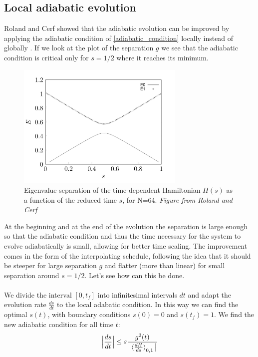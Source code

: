     \subsection{Local adiabatic evolution}\label{subsec:local adiabatic}
    Roland and Cerf showed that the adiabatic evolution can be improved by applying the adiabatic condition of \cref{adiabatic_condition} locally instead of globally \cite{Roland2002}. If we look at the plot of the separation $g$ we see that the adiabatic condition is critical only for $s=1/2$ where it reaches its minimum.
    \begin{figure}[h]
      \centering
      \includegraphics[width=80mm]{figures/chapter1/separation}
      \caption[Eigenvalue separation of the time-dependent Hamiltonian $H(s)$ as a function of the reduced time $s$, for N=64]{Eigenvalue separation of the time-dependent Hamiltonian $H(s)$ as a function of the reduced time $s$, for N=64. \textit{Figure from Roland and Cerf} \cite{Roland2002}}
      \label{separation_figure}
    \end{figure}
    At the beginning and at the end of the evolution the separation is large enough so that the adiabatic condition and thus the time necessary for the system to evolve adiabatically is small, allowing for better time scaling. The improvement comes in the form of the interpolating schedule, following the idea that it should be steeper for large separation $g$ and flatter (more than linear) for small separation around $s=1/2$. Let's see how can this be done. \\ \\
    We divide the interval $[0,t_f]$ into infinitesimal intervals $dt$ and adapt the evolution rate $\frac{ds}{dt}$ to the local adabatic condition. In this way we can find the optimal $s(t)$, with boundary conditions $s(0)=0$ and $s(t_f)=1$. We find the new adiabatic condition for all time $t$:
    \begin{equation}
      \Big|\frac{ds}{dt}\Big|\leq\varepsilon\frac{g^2(t)}{\big|\braket{\frac{dH}{ds}}_{0,1}\big|}
    \end{equation}
